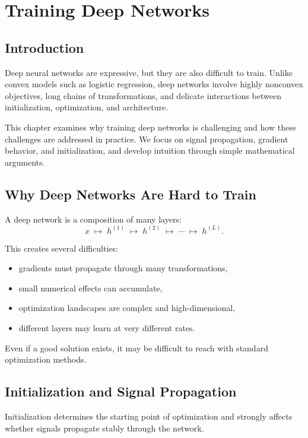 \chapter{Training Deep Networks}

\section{Introduction}

Deep neural networks are expressive, but they are also difficult to train. Unlike convex models such as logistic regression, deep networks involve highly nonconvex objectives, long chains of transformations, and delicate interactions between initialization, optimization, and architecture.

This chapter examines why training deep networks is challenging and how these challenges are addressed in practice. We focus on signal propagation, gradient behavior, and initialization, and develop intuition through simple mathematical arguments.

\section{Why Deep Networks Are Hard to Train}

A deep network is a composition of many layers:
\[
x \;\mapsto\; h^{(1)} \;\mapsto\; h^{(2)} \;\mapsto\; \cdots \;\mapsto\; h^{(L)}.
\]

This creates several difficulties:
\begin{itemize}
    \item gradients must propagate through many transformations,
    \item small numerical effects can accumulate,
    \item optimization landscapes are complex and high-dimensional,
    \item different layers may learn at very different rates.
\end{itemize}

Even if a good solution exists, it may be difficult to reach with standard optimization methods.

\section{Initialization and Signal Propagation}

Initialization determines the starting point of optimization and strongly affects whether signals propagate stably through the network.


